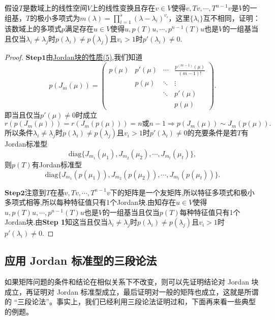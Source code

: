 \documentclass[../../main.tex]{subfiles}
\begin{document}
\begin{example}
假设\( T \)是数域上的线性空间\( V \)上的线性变换且存在\( v \in V \)使得\( v,Tv,\cdots,T^{n-1}v \)是\( V \)的一组基，\( T \)的极小多项式为\( m(\lambda)=\prod_{i=1}^{s}(\lambda-\lambda_i)^{v_i} \)，这里\( \{\lambda_i\} \)互不相同，证明：该数域上的多项式\( p \)满足存在\( u \in V \)使得\( u,p(T)u,\cdots,p^{n-1}(T)u \)也是\( V \)的一组基当且仅当\( \lambda_i \neq \lambda_j \)时\( p(\lambda_i) \neq p(\lambda_j) \)且\( v_i > 1 \)时\( p'(\lambda_i) \neq 0 \).
\end{example}
\begin{proof}
$\mathbf{Step}\mathbf{1}$由\hyperref[proposition:Jordan块的性质]{Jordan块的性质(5)},我们知道
\[
p\left(J_m(\mu)\right)=\begin{pmatrix}
p(\mu)& p'(\mu)& \cdots& \frac{p^{(m-1)}(\mu)}{(m-1)!}\\
& p(\mu)& \ddots& \vdots\\
& & \ddots& p'(\mu)\\
& & & p(\mu)
\end{pmatrix}.
\]
即当且仅当$p'(\mu)\neq 0$时成立
\[
r\left( p\left( J_m(\mu ) \right) \right) =r\left( J_m(p(\mu )) \right) =n\text{或}n-1\Longrightarrow 
p\left(J_m(\mu)\right)\sim J_m(p(\mu)).
\]
所以条件$\lambda_i\neq \lambda_j$时$p(\lambda_i)\neq p(\lambda_j)$且$v_i>1$时$p'(\lambda_i)\neq 0$的充要条件是若$T$有Jordan标准型
\[
\text{diag}\{J_{m_1}(\mu_1),J_{m_2}(\mu_2),\cdots,J_{m_t}(\mu_t)\},
\]
则$p(T)$有Jordan标准型
\[
\text{diag}\{J_{m_1}(p(\mu_1)),J_{m_2}(p(\mu_2)),\cdots,J_{m_t}(p(\mu_t))\}.
\]

$\mathbf{Step}\mathbf{2}$注意到$T$在基$v,Tv,\cdots,T^{n-1}v$下的矩阵是一个友矩阵,所以特征多项式和极小多项式相等,所以每种特征值只有1个Jordan块.由知存在$u\in V$使得$u,p(T)u,\cdots,p^{n-1}(T)u$也是$V$的一组基当且仅当$p(T)$每种特征值只有1个Jordan块.由\textbf{Step 1}知这当且仅当$\lambda_i\neq \lambda_j$时$p(\lambda_i)\neq p(\lambda_j)$且$v_i>1$时$p'(\lambda_i)\neq 0$.

\end{proof}









\subsection{应用 Jordan 标准型的三段论法}
 
如果矩阵问题的条件和结论在相似关系下不改变，则可以先证明结论对 Jordan 块成立，再证明对 Jordan 标准型成立，最后证明对一般的矩阵也成立，这就是所谓的 “三段论法”。事实上，我们已经利用三段论法证明过和，下面再来看一些典型的例题。
\end{document}
